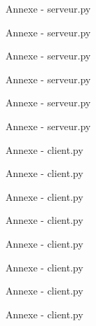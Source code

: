 \documentclass{beamer}
\begin{document}
\begin{frame}{Annexe - serveur.py}

\end{frame}

\begin{frame}{Annexe - serveur.py}

\end{frame}

\begin{frame}{Annexe - serveur.py}

\end{frame}

\begin{frame}{Annexe - serveur.py}

\end{frame}

\begin{frame}{Annexe - serveur.py}

\end{frame}

\begin{frame}{Annexe - serveur.py}

\end{frame}

\begin{frame}{Annexe - client.py}

\end{frame}

\begin{frame}{Annexe - client.py}

\end{frame}

\begin{frame}{Annexe - client.py}

\end{frame}

\begin{frame}{Annexe - client.py}

\end{frame}

\begin{frame}{Annexe - client.py}

\end{frame}

\begin{frame}{Annexe - client.py}

\end{frame}

\begin{frame}{Annexe - client.py}

\end{frame}

\begin{frame}{Annexe - client.py}

\end{frame}
\end{document}
